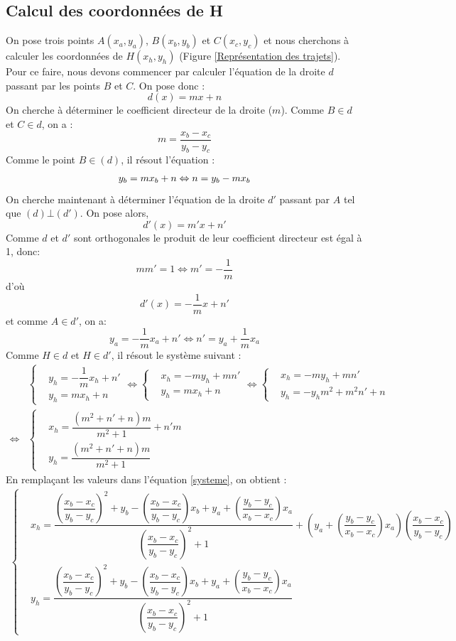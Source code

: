 \subsection{Calcul des coordonnées de H}
On pose trois points $ A(x_a,y_a) $, $ B(x_b,y_b) $ et $ C(x_c,y_c) $ et nous cherchons à calculer les coordonnées de $ H(x_h,y_h) $ (Figure \ref{Représentation des trajets}).
Pour ce faire, nous devons commencer par calculer l'équation de la droite $ d $ passant par les points $B$ et $C$.
On pose donc : 
\[
 d(x) = mx + n
\]
On cherche à déterminer le coefficient directeur de la droite ($m$). Comme $B \in d$ et $C \in d$, on a :
\[
   m =  \frac{x_b-x_c}{y_b-y_c}
\]
Comme le point $B \in (d)$, il résout l'équation :
\[
   y_b = mx_b + n \\
   \Leftrightarrow n = y_b - mx_b
\]
On cherche maintenant à déterminer l'équation de la droite $ d' $ passant par $ A $ tel que $ (d)\bot (d') $. On pose alors, 
 \[
 d'(x) = m'x + n'
\]
Comme $d$ et $d'$ sont orthogonales le produit de leur coefficient directeur est égal à 1, donc:
\[
	mm' = 1 \Leftrightarrow m' = -\frac{1}{m}	
\]
d'où
\[
	d'(x) = -\frac{1}{m}x+n'
\]
et comme $ A \in d' $, on a:
\[
	y_a = -\frac{1}{m}x_a + n' \Leftrightarrow n' = y_a + \frac{1}{m}x_a
\]
Comme $ H \in d$ et $H \in d'$, il résout le système suivant :
\begin{align}
    &\begin{cases}
   		 & y_h = -\dfrac{1}{m}x_h + n'\\
   		 & y_h = mx_h + n
    \end{cases} 
    \Leftrightarrow
    \begin{cases}
   		& x_h = -my_h + mn'\\
    	& y_h = mx_h + n
    \end{cases} 
    \Leftrightarrow
    \begin{cases}
   		& x_h = -my_h + mn'\\
    	& y_h = -y_hm^2 + m^2n' + n
    \end{cases} \\
    \Leftrightarrow
    \label{systeme}
    &\begin{cases}
   		& x_h = \dfrac{(m^2+n'+n)m}{m^2+1} + n'm \\
    	& y_h = \dfrac{(m^2+n'+n)m}{m^2+1}
    \end{cases}
\end{align}
En remplaçant les valeurs dans l'équation \eqref{systeme}, on obtient :
\begin{align}
	\begin{cases}
		& x_h = \dfrac{\left( \dfrac{x_b - x_c}{y_b - y_c}\right)^2 + y_b - \left( \dfrac{x_b - x_c}{y_b - y_c}\right) x_b + y_a + \left( \dfrac{y_b - y_c}{x_b - x_c}\right) x_a}{\left( \dfrac{x_b - x_c}{y_b - y_c}\right)^2 + 1} + \left( y_a + \left( \dfrac{y_b - y_c}{x_b - x_c}\right) x_a\right) \left( \dfrac{x_b - x_c}{y_b - y_c}\right)  \\
    	& y_h = \dfrac{\left( \dfrac{x_b - x_c}{y_b - y_c}\right)^2 + y_b - \left( \dfrac{x_b - x_c}{y_b - y_c}\right) x_b + y_a + \left( \dfrac{y_b - y_c}{x_b - x_c}\right) x_a}{\left( \dfrac{x_b - x_c}{y_b - y_c}\right)^2 + 1}
	\end{cases}
\end{align}
